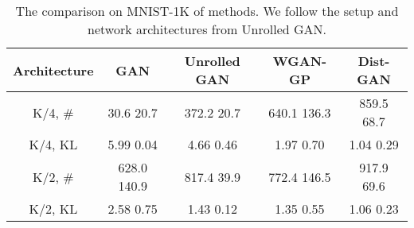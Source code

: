 \documentclass[runningheads]{llncs}
\begin{document}
\begin{table*}
\centering
\scriptsize
\caption{The comparison on MNIST-1K of methods. We follow the setup and network architectures from Unrolled GAN.}
\begin{tabular}{c | c | c | c | c}
\textbf{Architecture} & \textbf{GAN} & \textbf{Unrolled GAN} & \textbf{WGAN-GP} & \textbf{Dist-GAN}\\ 
\hline
K/4, \# & 30.6  20.7 & 372.2  20.7 & 640.1  136.3 & 859.5  68.7 \\ 
K/4, KL & 5.99  0.04 & 4.66  0.46 & 1.97  0.70 & 1.04  0.29\\
\hline
K/2, \# & 628.0  140.9 & 817.4  39.9 & 772.4  146.5 & 917.9  69.6 \\ 
K/2, KL & 2.58  0.75 & 1.43  0.12 & 1.35  0.55  & 1.06  0.23
\end{tabular}
\label{mnist1k_comparison_01}
\end{table*}
\end{document}
